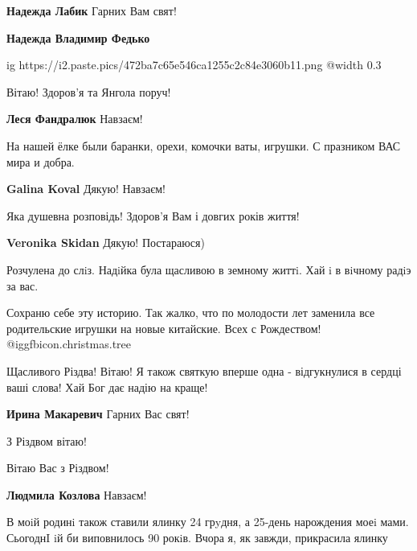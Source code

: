 \begin{itemize}
\begin{itemize} %
\textbf{Надежда Лабик} Гарних Вам свят!

\textbf{Надежда Владимир Федько}

\ifcmt
  ig https://i2.paste.pics/472ba7c65e546ca1255c2c84e3060b11.png
  @width 0.3
\fi

\end{itemize} %

Вітаю! Здоров'я та Янгола поруч!

\textbf{Леся Фандралюк} Навзаєм!

На нашей ёлке были баранки, орехи, комочки ваты, игрушки. С празником ВАС мира и добра.

\textbf{Galina Koval} Дякую! Навзаєм!


Яка душевна розповідь! Здоров'я Вам і довгих років життя!

\textbf{Veronika Skidan} Дякую! Постараюся)

Розчулена до слiз. Надiйка була щасливою в земному життi. Хай i в вiчному радiэ за вас.


Сохраню себе эту историю. Так жалко, что по молодости лет заменила все
родительские игрушки на новые китайские.  Всех с Рождеством!
@igg{fbicon.christmas.tree} 


Щасливого Різдва! Вітаю! Я також святкую вперше одна - відгукнулися в сердці ваші
слова! Хай Бог дає надію на краще!

\textbf{Ирина Макаревич} Гарних Вас свят!

З Різдвом вітаю!

Вітаю Вас з Різдвом!

\textbf{Людмила Козлова} Навзаєм!


В моiй родинi також ставили ялинку 24 грyдня, а 25-день нарождения моеi
мами. СьогоднI iй би виповнилось 90 рокiв. Вчора я, як завжди, прикрасила ялинку
\end{itemize} %
